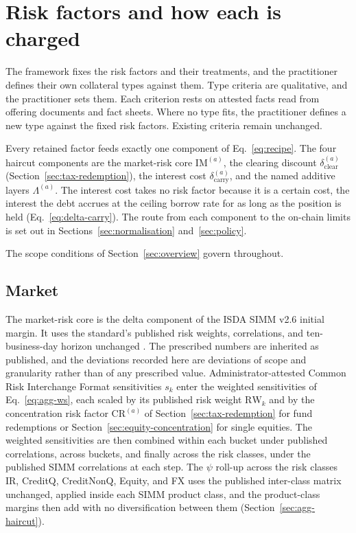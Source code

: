 \section{Risk factors and how each is charged}\label{sec:taxonomy}

The framework fixes the risk factors and their treatments, and the practitioner
defines their own collateral types against them. Type criteria are qualitative, and the
practitioner sets them. Each criterion rests on attested facts read from offering documents
and fact sheets. Where no type fits, the practitioner defines a new type against the fixed risk
factors. Existing criteria remain unchanged.

Every retained factor feeds exactly one component of Eq.~\eqref{eq:recipe}. The four haircut components are
the market-risk core $\mathrm{IM}^{(a)}$, the clearing discount
$\delta_{\mathrm{clear}}^{(a)}$ (Section~\ref{sec:tax-redemption}), the interest cost
$\delta_{\mathrm{carry}}^{(a)}$, and the named additive layers $\Lambda^{(a)}$. The
interest cost takes no risk factor because it is a certain cost, the interest the debt
accrues at the ceiling borrow rate for as long as the position is held
(Eq.~\eqref{eq:delta-carry}). The route from each component to the on-chain limits is set out in
Sections~\ref{sec:normalisation} and~\ref{sec:policy}.

The scope conditions of Section~\ref{sec:overview} govern throughout.

\subsection{Market}\label{sec:tax-market}
The market-risk core is the delta component of the ISDA SIMM v2.6 initial margin. It uses the
standard's published risk weights, correlations, and ten-business-day horizon unchanged
\citep{isda_simm_v2_6}. The prescribed numbers are inherited as published, and the deviations
recorded here are deviations of scope and granularity rather than of any prescribed value.
Administrator-attested Common Risk Interchange Format sensitivities $s_k$ enter the weighted sensitivities of
Eq.~\eqref{eq:agg-ws}, each scaled by its published risk weight $\mathrm{RW}_k$ and by the
concentration risk factor $\mathrm{CR}^{(a)}$ of Section~\ref{sec:tax-redemption} for fund redemptions or Section~\ref{sec:equity-concentration} for single equities. The
weighted sensitivities are then combined within each bucket under published correlations,
across buckets, and finally across the risk classes, under the published SIMM correlations at
each step. The $\psi$ roll-up across the risk classes IR, CreditQ, CreditNonQ, Equity, and
FX uses the published inter-class matrix unchanged, applied inside each SIMM product class, and the
product-class margins then add with no diversification between them (Section~\ref{sec:agg-haircut}).

